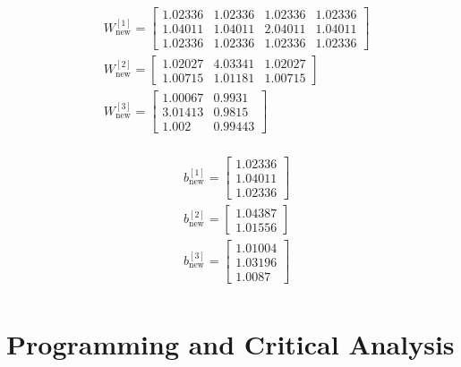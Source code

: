 \documentclass{article}
\begin{document}
\setlength{\columnseprule}{0pt}
\begin{multicols}{2}

\begin{center}
    \begin{align*}
        &W^{[1]}_{\text{new}} = \begin{bmatrix} 1.02336 & 1.02336 & 1.02336 & 1.02336 \\  1.04011 & 1.04011 & 2.04011 & 1.04011 \\  1.02336 & 1.02336 & 1.02336 & 1.02336\end{bmatrix} \\  
        &W^{[2]}_{\text{new}} = \begin{bmatrix} 1.02027 & 4.03341 & 1.02027 \\  1.00715 & 1.01181 & 1.00715  \end{bmatrix} \\
        &W^{[3]}_{\text{new}} = \begin{bmatrix} 1.00067 & 0.9931  \\  3.01413 & 0.9815  \\  1.002   & 0.99443  \end{bmatrix} \\
    \end{align*}
\end{center}


\columnbreak

\begin{center}
    \begin{align*}
        &b^{[1]}_{\text{new}} = \begin{bmatrix} 1.02336 \\  1.04011 \\  1.02336\end{bmatrix} \\
        &b^{[2]}_{\text{new}} = \begin{bmatrix} 1.04387 \\  1.01556\end{bmatrix} \\
        &b^{[3]}_{\text{new}} = \begin{bmatrix} 1.01004 \\  1.03196 \\  1.0087 \end{bmatrix} \\
    \end{align*}
\end{center}


\end{multicols}

\newpage

\section*{Programming and Critical Analysis}
\end{document}
